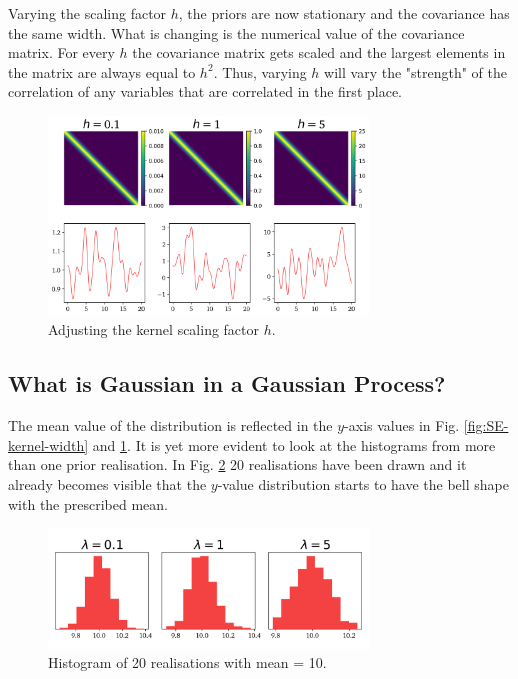 \documentclass[10pt,twocolumn]{article}
\begin{document}
Varying the scaling factor $h$, the priors are now stationary and the covariance has the same width. What is changing is the numerical value of the covariance matrix. For every $h$ the covariance matrix gets scaled and the largest elements in the matrix are always equal to $h^2$. Thus, varying $h$  will vary the "strength" of the correlation of any variables that are correlated in the first place.

\begin{figure}[H]
\centering\includegraphics[width=8.5cm]{cov-Kernel-SE-changing-h-tex.png}
\caption{Adjusting the kernel scaling factor $h$.}
\label{fig:SE-kernel-scaling-factor}
\end{figure}

\subsection{What is Gaussian in a Gaussian Process?}

The mean value of the distribution is reflected in the $y$-axis values in Fig. \ref{fig:SE-kernel-width} and \ref{fig:SE-kernel-scaling-factor}. It is yet more evident to look at the histograms from more than one prior realisation. In Fig. \ref{fig:realisation-histogram} 20 realisations have been drawn and it already becomes visible that the $y$-value distribution starts to have the bell shape with the prescribed mean.


\begin{figure}[H]
\centering\includegraphics[width=8.5cm]{realisation-Histogram-tex.png}
\caption{Histogram of 20 realisations with mean = 10.}
\label{fig:realisation-histogram}
\end{figure}
\end{document}
